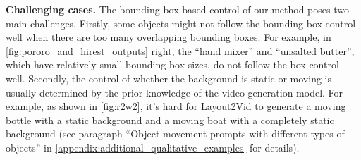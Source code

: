 \documentclass{article}
\begin{document}
\noindent\textbf{Challenging cases.} 
The bounding box-based control of our method poses two main challenges.
Firstly, some objects might not follow the bounding box control well when there are too many overlapping bounding boxes. For example, in \cref{fig:pororo_and_hirest_outputs} right, the ``hand mixer'' and ``unsalted butter'', which have relatively small bounding box sizes, do not follow the box control well. 
Secondly, the control of whether the background is static or moving is usually determined by the prior knowledge of the video generation model. 
For example, as shown in \cref{fig:r2w2}, it’s hard for  Layout2Vid to generate a moving bottle with a static background and a moving boat with a completely static background
(see paragraph ``Object movement prompts with different types of objects'' in \cref{appendix:additional_qualitative_examples} for details).

\begin{table}[t]
    \centering
    \caption{Ablation of video generation with video plans generated from different LLMs on MSR-VTT and ActionBench-Directions.
    }
    \label{table:ablation_llms}
\vspace{-3pt}
\end{table}
\normalsize 
\end{document}
